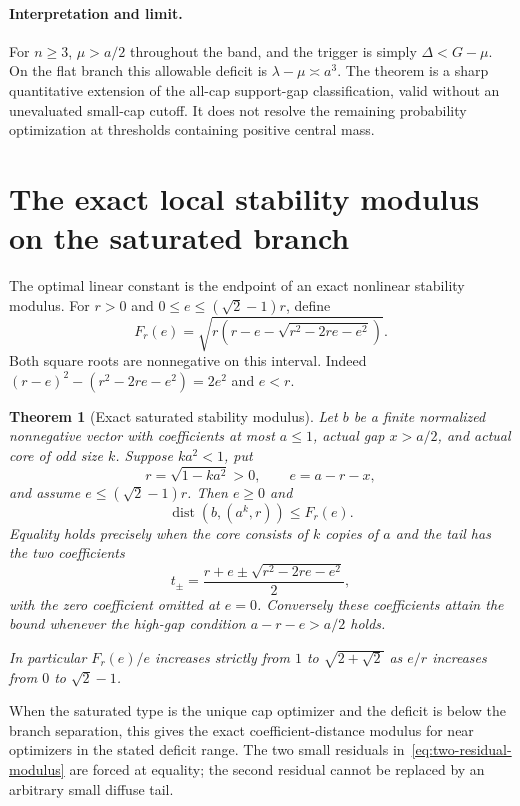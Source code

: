 \documentclass[11pt]{article}
\newtheorem{theorem}{Theorem}[section]
\theoremstyle{remark}\newtheorem{remark}[theorem]{Remark}
\begin{document}
\paragraph{Interpretation and limit.}
For $n\ge3$, $\mu>a/2$ throughout the band, and the trigger is simply
$\Delta<G-\mu$. On the flat branch this allowable deficit is
$\lambda-\mu\asymp a^3$. The theorem is a sharp quantitative extension
of the all-cap support-gap classification, valid without an unevaluated
small-cap cutoff. It does not resolve the remaining probability
optimization at thresholds containing positive central mass.

\section{The exact local stability modulus on the saturated branch}
\label{sec:exact-saturated-stability}

The optimal linear constant is the endpoint of an exact nonlinear
stability modulus. For $r>0$ and $0\le e\le(\sqrt2-1)r$, define
\[
 F_r(e)=\sqrt{r\left(r-e-\sqrt{r^2-2re-e^2}\right)}.
\]
Both square roots are nonnegative on this interval. Indeed
$(r-e)^2-(r^2-2re-e^2)=2e^2$ and $e<r$.

\begin{theorem}[Exact saturated stability modulus]
\label{thm:exact-saturated-stability}
Let $b$ be a finite normalized nonnegative vector with coefficients at
most $a\le1$, actual gap $x>a/2$, and actual core of odd size $k$.
Suppose $ka^2<1$, put
\[
 r=\sqrt{1-ka^2}>0,\qquad e=a-r-x,
\]
and assume $e\le(\sqrt2-1)r$. Then $e\ge0$ and
\begin{equation}\label{eq:exact-saturated-stability}
 \operatorname{dist}(b,(a^k,r))\le F_r(e).
\end{equation}
Equality holds precisely when the core consists of $k$ copies of $a$
and the tail has the two coefficients
\begin{equation}\label{eq:two-residual-modulus}
 t_\pm=\frac{r+e\pm\sqrt{r^2-2re-e^2}}2,
\end{equation}
with the zero coefficient omitted at $e=0$.
Conversely these coefficients attain the bound whenever the high-gap
condition $a-r-e>a/2$ holds.

In particular $F_r(e)/e$ increases strictly from $1$ to
$\sqrt{2+\sqrt2}$ as $e/r$ increases from $0$ to $\sqrt2-1$.
\end{theorem}

When the saturated type is the unique cap optimizer and the deficit is
below the branch separation, this gives the exact coefficient-distance
modulus for near optimizers in the stated deficit range. The two small
residuals in~\eqref{eq:two-residual-modulus} are forced at equality;
the second residual cannot be replaced by an arbitrary small diffuse tail.
\end{document}
